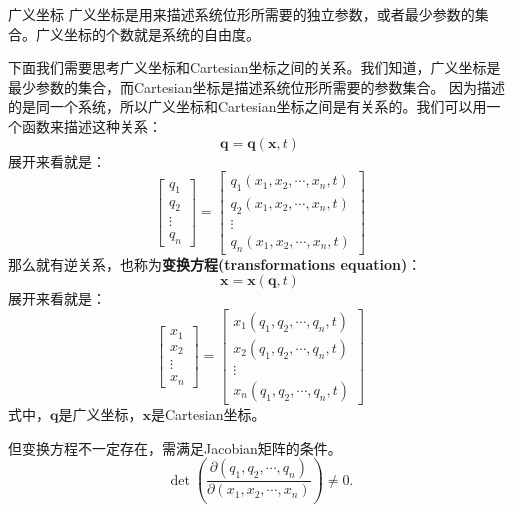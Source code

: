 \begin{mydefinition}{广义坐标}
广义坐标是用来描述系统位形所需要的独立参数，或者最少参数的集合。广义坐标的个数就是系统的自由度。
\end{mydefinition}
下面我们需要思考广义坐标和Cartesian坐标之间的关系。我们知道，广义坐标是最少参数的集合，而Cartesian坐标是描述系统位形所需要的参数集合。
因为描述的是同一个系统，所以广义坐标和Cartesian坐标之间是有关系的。我们可以用一个函数来描述这种关系：
\begin{equation}\label{eq:1.1}
\boldsymbol{q} = \boldsymbol{q}(\boldsymbol{x},t)
\end{equation}
展开来看就是：
    \begin{equation}\label{eq:1.2}
\begin{bmatrix} q_1 \\ q_2 \\ \vdots \\ q_n \end{bmatrix} = \begin{bmatrix} q_1(x_1,x_2,\cdots,x_n,t) \\ q_2(x_1,x_2,\cdots,x_n,t) \\ \vdots \\ q_n(x_1,x_2,\cdots,x_n,t) \end{bmatrix}
\end{equation}
那么就有逆关系，也称为\textbf{变换方程(transformations equation)}：
\begin{equation}\label{eq:1.3}
\boldsymbol{x} = \boldsymbol{x}(\boldsymbol{q},t)
\end{equation}
展开来看就是：
\begin{equation}\label{eq:1.4}
\begin{bmatrix} x_1 \\ x_2 \\ \vdots \\ x_n \end{bmatrix} = \begin{bmatrix} x_1(q_1,q_2,\cdots,q_n,t) \\ x_2(q_1,q_2,\cdots,q_n,t) \\ \vdots \\ x_n(q_1,q_2,\cdots,q_n,t) \end{bmatrix}
\end{equation}
式中，$\boldsymbol{q}$是广义坐标，$\boldsymbol{x}$是Cartesian坐标。

但变换方程不一定存在，需满足Jacobian矩阵的条件。
\begin{equation}\label{eq:1.5}
\det\left(\frac{\partial(q_1, q_2, \cdots, q_n)}{\partial(x_1, x_2, \cdots, x_n)}\right) \neq 0.
\end{equation}

